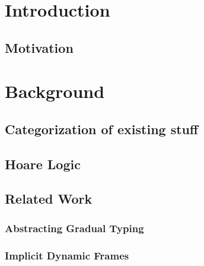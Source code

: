 
\chapter{Introduction}
\label{ch:introduction}


    \section{Motivation}
    \label{sec:motivationexamples}
    



\chapter{Background}

\section{Categorization of existing stuff}
\label{sec:categorization-of-existing}


\section{Hoare Logic}
\label{sec:hoare-logic}


\section{Related Work}
    \subsection{Abstracting Gradual Typing}
    \label{ssec:abstracting-gradual-typing}
    
    
    \subsection{Implicit Dynamic Frames}
    \label{ssec:implicit-dynamic-frames}
    


